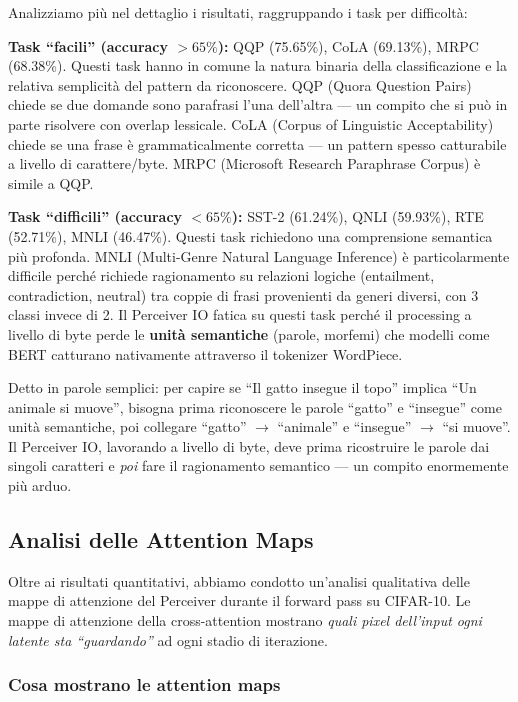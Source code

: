 \documentclass[12pt,a4paper]{article}
\begin{document}
Analizziamo pi\`u nel dettaglio i risultati, raggruppando i task per difficolt\`a:

\textbf{Task ``facili'' (accuracy $> 65\%$):} QQP (75.65\%), CoLA (69.13\%), MRPC (68.38\%). Questi task hanno in comune la natura binaria della classificazione e la relativa semplicit\`a del pattern da riconoscere. QQP (Quora Question Pairs) chiede se due domande sono parafrasi l'una dell'altra --- un compito che si pu\`o in parte risolvere con overlap lessicale. CoLA (Corpus of Linguistic Acceptability) chiede se una frase \`e grammaticalmente corretta --- un pattern spesso catturabile a livello di carattere/byte. MRPC (Microsoft Research Paraphrase Corpus) \`e simile a QQP.

\textbf{Task ``difficili'' (accuracy $< 65\%$):} SST-2 (61.24\%), QNLI (59.93\%), RTE (52.71\%), MNLI (46.47\%). Questi task richiedono una comprensione semantica pi\`u profonda. MNLI (Multi-Genre Natural Language Inference) \`e particolarmente difficile perch\'e richiede ragionamento su relazioni logiche (entailment, contradiction, neutral) tra coppie di frasi provenienti da generi diversi, con 3 classi invece di 2. Il Perceiver IO fatica su questi task perch\'e il processing a livello di byte perde le \textbf{unit\`a semantiche} (parole, morfemi) che modelli come BERT catturano nativamente attraverso il tokenizer WordPiece.

Detto in parole semplici: per capire se ``Il gatto insegue il topo'' implica ``Un animale si muove'', bisogna prima riconoscere le parole ``gatto'' e ``insegue'' come unit\`a semantiche, poi collegare ``gatto'' $\to$ ``animale'' e ``insegue'' $\to$ ``si muove''. Il Perceiver IO, lavorando a livello di byte, deve prima ricostruire le parole dai singoli caratteri e \emph{poi} fare il ragionamento semantico --- un compito enormemente pi\`u arduo.


\subsection{Analisi delle Attention Maps} \label{sec:exp_attention}

Oltre ai risultati quantitativi, abbiamo condotto un'analisi qualitativa delle mappe di attenzione del Perceiver durante il forward pass su CIFAR-10. Le mappe di attenzione della cross-attention mostrano \textit{quali pixel dell'input ogni latente sta ``guardando''} ad ogni stadio di iterazione.

\subsubsection{Cosa mostrano le attention maps}
\end{document}
